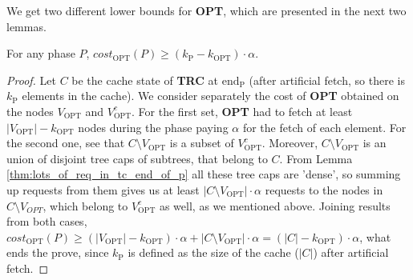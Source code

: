 We get two different lower bounds for \textbf{OPT}, which are presented in the
next two lemmas.
\begin{lemma}
For any phase $P$, $cost_{\mathrm{OPT}}(P) \geq
(k_{\mathrm{P}} - k_{\mathrm{OPT}}) \cdot \alpha$.
\label{thm:opt_bound_with_k}
\end{lemma}
\begin{proof}
Let $C$ be the cache state of \textbf{TRC} at
$\mathrm{end_P}$ (after artificial fetch, so there is $k_{\mathrm{P}}$ elements in the
cache). We consider separately the cost of \textbf{OPT} obtained on the nodes
$V_{\mathrm{OPT}}$ and $V_{\mathrm{OPT}}^c$. For the first set, \textbf{OPT} had
to fetch at least $|V_{\mathrm{OPT}}| - k_{\mathrm{OPT}}$ nodes during the phase
paying $\alpha$ for the fetch of each element. For the second one, see that $C \setminus
V_{\mathrm{OPT}}$ is a subset of $V_{\mathrm{OPT}}^c$. Moreover, $C \setminus
V_{\mathrm{OPT}}$ is an union of disjoint tree caps of subtrees, that belong to
$C$. From Lemma \ref{thm:lots_of_req_in_tc_end_of_p} all these tree caps are
'dense', so summing up requests from them gives us at least $|C \setminus
V_{\mathrm{OPT}}| \cdot \alpha$ requests to the nodes in $C \setminus V_{OPT}$,
which belong to $V_{\mathrm{OPT}}^c$ as well, as we mentioned above. Joining
results from both cases, $cost_{\mathrm{OPT}}(P) \geq (|V_{\mathrm{OPT}}| -
k_{\mathrm{OPT}}) \cdot \alpha + |C \setminus V_{\mathrm{OPT}}| \cdot \alpha =
(|C| - k_{\mathrm{OPT}}) \cdot \alpha$, what ends the prove, since $k_{\mathrm{P}}$ is
defined as the size of the cache ($|C|$) after artificial fetch.
\end{proof}
